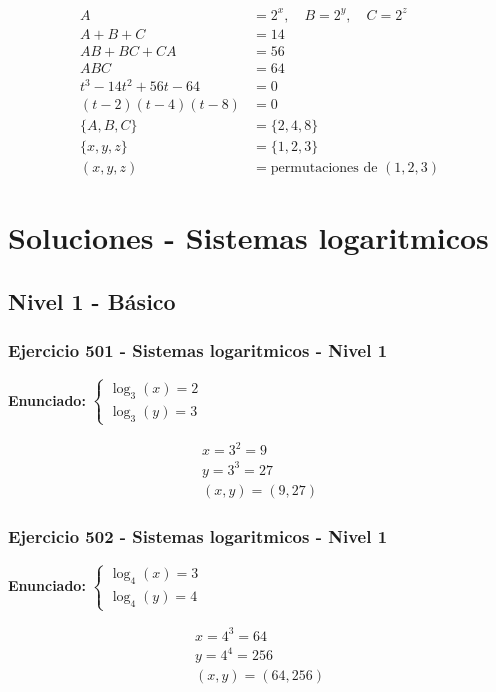 \documentclass[12pt,a4paper]{article}
\begin{document}
\[
\begin{aligned}
A&=2^x,
\quad B=2^y,
\quad C=2^z\\
A+B+C&=14\\
AB+BC+CA&=56\\
ABC&=64\\
t^3-14t^2+56t-64&=0\\
(t-2)(t-4)(t-8)&=0\\
\{A,B,C\}&=\{2,4,8\}\\
\{x,y,z\}&=\{1,2,3\}\\
(x,y,z)&=\boxed{\text{permutaciones de }(1,2,3)}
\end{aligned}
\]


\newpage
\section*{Soluciones - Sistemas logaritmicos}

\subsection*{Nivel 1 - Básico}

\subsubsection*{Ejercicio 501 - Sistemas logaritmicos - Nivel 1}
\textbf{Enunciado:} \(\begin{cases} \log_{3}\left(x\right)=2\\ \log_{3}\left(y\right)=3\end{cases}\)

\[
\begin{aligned}
x=3^{2}=9\\
y=3^{3}=27\\
\boxed{(x,y)=(9,27)}
\end{aligned}
\]


\subsubsection*{Ejercicio 502 - Sistemas logaritmicos - Nivel 1}
\textbf{Enunciado:} \(\begin{cases} \log_{4}\left(x\right)=3\\ \log_{4}\left(y\right)=4\end{cases}\)

\[
\begin{aligned}
x=4^{3}=64\\
y=4^{4}=256\\
\boxed{(x,y)=(64,256)}
\end{aligned}
\]
\end{document}
